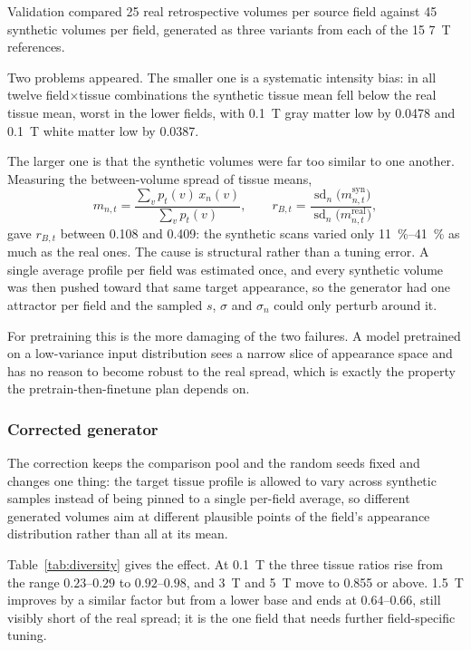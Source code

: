 \documentclass[11pt,a4paper]{article}
\begin{document}
Validation compared 25 real retrospective volumes per source field against 45 synthetic volumes per
field, generated as three variants from each of the 15 \SI{7}{\tesla} references.

Two problems appeared. The smaller one is a systematic intensity bias: in all twelve
field$\times$tissue combinations the synthetic tissue mean fell below the real tissue mean, worst in the
lower fields, with \SI{0.1}{\tesla} gray matter low by \num{0.0478} and \SI{0.1}{\tesla} white matter low
by \num{0.0387}.

The larger one is that the synthetic volumes were far too similar to one another. Measuring the
between-volume spread of tissue means,
\begin{equation}
  m_{n,t} = \frac{\sum_v p_t(v)\,x_n(v)}{\sum_v p_t(v)},
  \qquad
  r_{B,t} = \frac{\operatorname{sd}_n\big(m^{\text{syn}}_{n,t}\big)}
                 {\operatorname{sd}_n\big(m^{\text{real}}_{n,t}\big)},
\end{equation}
gave $r_{B,t}$ between \num{0.108} and \num{0.409}: the synthetic scans varied only
\SIrange{11}{41}{\percent} as much as the real ones. The cause is structural rather than a tuning error.
A single average profile per field was estimated once, and every synthetic volume was then pushed toward
that same target appearance, so the generator had one attractor per field and the sampled $s$, $\sigma$
and $\sigma_n$ could only perturb around it.

For pretraining this is the more damaging of the two failures. A model pretrained on a low-variance input
distribution sees a narrow slice of appearance space and has no reason to become robust to the real
spread, which is exactly the property the pretrain-then-finetune plan depends on.

\subsubsection{Corrected generator}

The correction keeps the comparison pool and the random seeds fixed and changes one thing: the target
tissue profile is allowed to vary across synthetic samples instead of being pinned to a single per-field
average, so different generated volumes aim at different plausible points of the field's appearance
distribution rather than all at its mean.

Table~\ref{tab:diversity} gives the effect. At \SI{0.1}{\tesla} the three tissue ratios rise from the
range $0.23$--$0.29$ to $0.92$--$0.98$, and \SI{3}{\tesla} and \SI{5}{\tesla} move to \num{0.855} or
above. \SI{1.5}{\tesla} improves by a similar factor but from a lower base and ends at $0.64$--$0.66$,
still visibly short of the real spread; it is the one field that needs further field-specific tuning.
\end{document}
